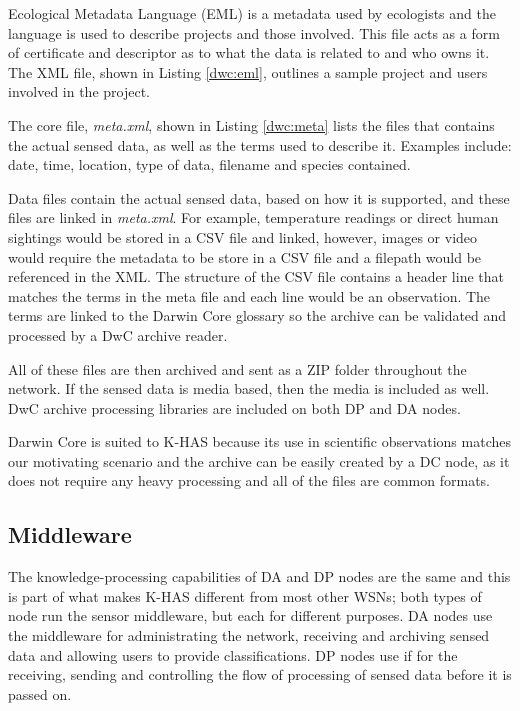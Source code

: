 Ecological Metadata Language (EML) is a metadata used by ecologists and the language is used to describe projects and those involved. This file acts as a form of certificate and descriptor as to what the data is related to and who owns it. The XML file, shown in Listing \ref{dwc:eml}, outlines a sample project and users involved in the project.



The core file, \textit{meta.xml}, shown in Listing \ref{dwc:meta} lists the files that contains the actual sensed data, as well as the terms used to describe it. Examples include: date, time, location, type of data, filename and species contained.



Data files contain the actual sensed data, based on how it is supported, and these files are linked in \textit{meta.xml}. For example, temperature readings or direct human sightings would be stored in a CSV file and linked, however, images or video would require the metadata to be store in a CSV file and a filepath would be referenced in the XML. The structure of the CSV file contains a header line that matches the terms in the meta file and each line would be an observation. The terms are linked to the Darwin Core glossary so the archive can be validated and processed by a DwC archive reader.

All of these files are then archived and sent as a ZIP folder throughout the network. If the sensed data is media based, then the media is included as well. DwC archive processing libraries are included on both DP and DA nodes.

Darwin Core is suited to K-HAS because its use in scientific observations matches our motivating scenario and the archive can be easily created by a DC node, as it does not require any heavy processing and all of the files are common formats.
	
	\subsection{Middleware}
	The knowledge-processing capabilities of DA and DP nodes are the same and this is part of what makes K-HAS different from most other WSNs; both types of node run the sensor middleware, but each for different purposes. DA nodes use the middleware for administrating the network, receiving and archiving sensed data and allowing users to provide classifications. DP nodes use if for the receiving, sending and controlling the flow of processing of sensed data before it is passed on.
	
